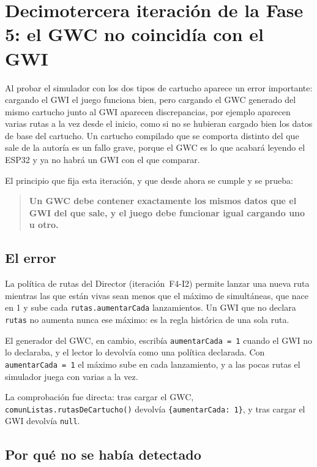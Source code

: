\section{Decimotercera iteración de la Fase 5: el GWC no coincidía con el GWI}
\label{sec:F5I13}

Al probar el simulador con los dos tipos de cartucho aparece un error importante: cargando el GWI el juego funciona bien, pero cargando el GWC generado del mismo cartucho junto al GWI aparecen discrepancias, por ejemplo aparecen varias rutas a la vez desde el inicio, como si no se hubieran cargado bien los datos de base del cartucho. Un cartucho compilado que se comporta distinto del que sale de la autoría es un fallo grave, porque el GWC es lo que acabará leyendo el ESP32 y ya no habrá un GWI con el que comparar.

El principio que fija esta iteración, y que desde ahora se cumple y se prueba:

\begin{quote}
\textbf{Un GWC debe contener exactamente los mismos datos que el GWI del que sale, y el juego debe funcionar igual cargando uno u otro.}
\end{quote}

\subsection{El error}
\label{sec:F5I13Error}

La política de rutas del Director (iteración~F4-I2) permite lanzar una nueva ruta mientras las que están vivas sean menos que el máximo de simultáneas, que nace en 1 y sube cada \texttt{rutas.aumentarCada} lanzamientos. Un GWI que no declara \texttt{rutas} no aumenta nunca ese máximo: es la regla histórica de una sola ruta.

El generador del GWC, en cambio, escribía \texttt{aumentarCada = 1} cuando el GWI no lo declaraba, y el lector lo devolvía como una política declarada. Con \texttt{aumentarCada = 1} el máximo sube en cada lanzamiento, y a las pocas rutas el simulador juega con varias a la vez.

La comprobación fue directa: tras cargar el GWC, \texttt{comunListas.rutasDeCartucho()} devolvía \texttt{\{aumentarCada: 1\}}, y tras cargar el GWI devolvía \texttt{null}.

\subsection{Por qué no se había detectado}
\label{sec:F5I13Porque}

